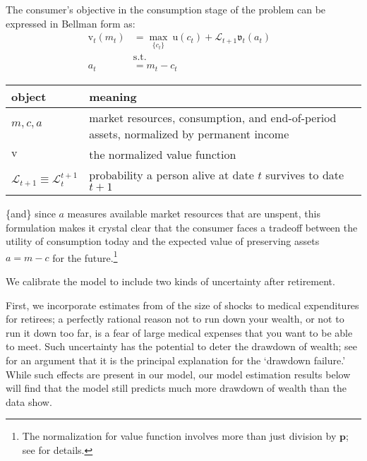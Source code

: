 \documentclass{article}
\newcommand{\uFunc}{\mathrm{u}}
\newcommand{\pLvl}{\mathbf{p}}
\newcommand{\vFunc}{\mathrm{v}}
\newcommand{\Alive}{\mathcal{L}}
\newcommand{\tranShkEmp}{\xi}
\newcommand{\cNrm}{c}
\newcommand{\RNrm}{\mathcal{R}}
\newcommand{\aNrm}{a}
\newcommand{\mNrm}{m}
\begin{document}
The consumer's objective in the consumption stage of the problem can be expressed in Bellman form as:
\begin{align}
    {\vFunc}_{t}({\mNrm}_{t}) & = \max_{\{\cNrm_{t}\}} ~ \uFunc(\cNrm_{t})+\Alive_{t+1} \mathfrak{v}_{t}(\aNrm_{t})
    \\ & \text{s.t.} &
    \\ \aNrm_{t} & = {\mNrm}_{t}-\cNrm_{t}
\end{align}

\newline
\bigskip\noindent
\begin{tabular}{p{}p{}}
\toprule
object & meaning \\
\hline
$\mNrm, \cNrm, \aNrm$ & market resources, consumption, and end-of-period assets, normalized by permanent income \\
$\vFunc$ & the normalized value function \\
$\Alive_{t+1} \equiv \Alive_{t}^{t+1}$ & probability a person alive at date $t$ survives to date $t+1$ \\
\bottomrule
\end{tabular}

\bigskip\newline
\{and\} since $\aNrm$ measures available market resources that are unspent, this formulation makes it crystal clear that the consumer faces a tradeoff between the utility of consumption today and the expected value of preserving assets $\aNrm=\mNrm -\cNrm$ for the future.\footnote{The normalization for value function involves more than just division by $\pLvl$; see \cite{BufferStockTheory} for details.}

We calibrate the model to include two kinds of uncertainty after retirement.

First, we incorporate estimates from \cite{velasquez-giraldoJMP} of the size of shocks to medical expenditures for retirees; a perfectly rational reason not to run down your wealth, or not to run it down too far, is a fear of large medical expenses that you want to be able to meet.  Such uncertainty has the potential to deter the drawdown of wealth; see \cite{ameriks2011joy} for an argument that it is the principal explanation for the `drawdown failure.'  While such effects are present in our model, our model estimation results below will find that the model still predicts much more drawdown of wealth than the data show.
\end{document}
